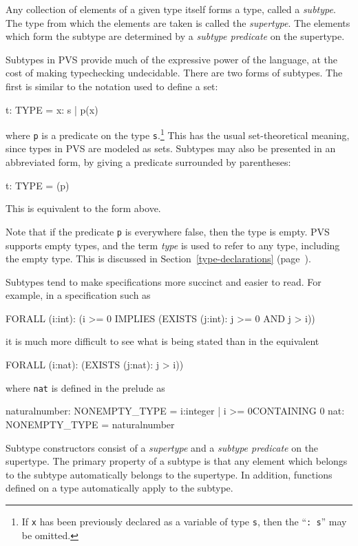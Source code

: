 Any collection of elements of a given type itself forms a type, called a
\emph{subtype}.  The type from which the elements are taken is called the
\emph{supertype}.  The elements which form the subtype
are determined by a \emph{subtype predicate} on
the supertype.

Subtypes in PVS provide much of the expressive power of the language,
at the cost of making typechecking undecidable.  There are two forms of
subtypes.  The first is similar to the notation used to define a set:
\begin{pvsex}
  t: TYPE = \setb{}x: s | p(x)\sete
\end{pvsex}
%
where \texttt{p} is a predicate on the type \texttt{s}.\footnote{If \texttt{x}
has been previously declared as a variable of type \texttt{s}, then the
``\texttt{:~s}'' may be omitted.} This has the usual set-theoretical
meaning, since types in PVS are modeled as sets.  Subtypes may also
be presented in an abbreviated form, by giving a predicate surrounded by
parentheses:
\begin{pvsex}
  t: TYPE = (p)
\end{pvsex}
%
This is equivalent to the form above.

Note that if the predicate \texttt{p} is everywhere false, then the type
is empty.  PVS supports empty types,
and the term \emph{type} is used to refer to any type, including the empty
type.  This is discussed in Section~\ref{type-declarations} (page~\pageref{type-declarations}).

Subtypes tend to make specifications more succinct and easier to read.
For example, in a specification such as
\begin{pvsex}
  FORALL (i:int):
    (i >= 0 IMPLIES (EXISTS (j:int): j >= 0 AND j > i))
\end{pvsex}
it is much more difficult to see what is being stated than in the
equivalent
\begin{pvsex}
  FORALL (i:nat): (EXISTS (j:nat): j > i))
\end{pvsex}
%
where \texttt{nat} is defined in the prelude as
\begin{pvsex}
  naturalnumber: NONEMPTY\_TYPE = \setb{}i:integer | i >= 0\sete CONTAINING 0
  nat: NONEMPTY\_TYPE = naturalnumber
\end{pvsex}

Subtype constructors consist of a \emph{supertype} and a
\emph{subtype predicate} on the supertype.  The
primary property of a subtype is that any element which belongs to the
subtype automatically belongs to the supertype.  In addition, functions
defined on a type automatically apply to the subtype.

